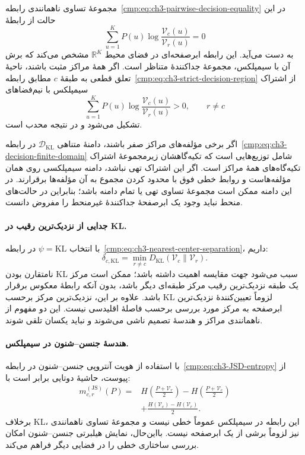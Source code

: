 مجموعهٔ تساوی ناهمانندی
رابطه~\eqref{cmp:eq:ch3-pairwise-decision-equality}
در این حالت از رابطهٔ
\begin{equation}\label{cmp:eq:ch3-kl-decision-hyperplane}
\sum_{u=1}^{K}P(u)
\log\frac{\mathcal V_c(u)}{\mathcal V_r(u)}=0
\end{equation}
به دست می‌آید. این رابطه ابرصفحه‌ای در فضای
محیط $\mathbb R^K$ مشخص می‌کند که برش آن
با سیمپلکس، مجموعهٔ جداکنندهٔ متناظر است.
اگر همهٔ مراکز مثبت باشند، ناحیهٔ تعلق قطعی
به طبقهٔ $c$ مطابق
رابطه~\eqref{cmp:eq:ch3-strict-decision-region}
از اشتراک سیمپلکس با نیم‌فضاهای
\[
\sum_{u=1}^{K}P(u)
\log\frac{\mathcal V_c(u)}{\mathcal V_r(u)}>0,
\qquad r\ne c
\]
تشکیل می‌شود و در نتیجه محدب است.

اگر برخی مؤلفه‌های مراکز صفر باشند،
دامنهٔ متناهی $\mathcal D_{\mathrm{KL}}$ در
رابطه~\eqref{cmp:eq:ch3-decision-finite-domain}
شامل توزیع‌هایی است که تکیه‌گاهشان زیرمجموعهٔ
اشتراک تکیه‌گاه‌های همهٔ مراکز است. اگر این
اشتراک تهی نباشد، دامنه سیمپلکسی روی همان
مؤلفه‌هاست و روابط خطی فوق با محدود کردن مجموع
به آن مؤلفه‌ها برقرارند. در این دامنه ممکن است
مجموعهٔ تساوی تهی یا تمام دامنه باشد؛ بنابراین
در حالت‌های منحط نباید وجود یک ابرصفحهٔ
جداکنندهٔ غیرمنحط را مفروض دانست.

\paragraph{جدایی از نزدیک‌ترین رقیب در KL.}
با انتخاب $\psi=\mathrm{KL}$ در
رابطه~\eqref{cmp:eq:ch3-nearest-center-separation}،
داریم:
\[
\delta_{c,\mathrm{KL}}=
\min_{r\ne c}D_{\mathrm{KL}}(\mathcal V_c\|\mathcal V_r).
\]
نامتقارن بودن KL سبب می‌شود جهت مقایسه اهمیت
داشته باشد؛ ممکن است مرکز یک طبقه نزدیک‌ترین
رقیب مرکز طبقه‌ای دیگر باشد، بدون آنکه رابطهٔ
معکوس برقرار باشد. علاوه بر این، نزدیک‌ترین
مرکز برحسب KL لزوماً تعیین‌کنندهٔ نزدیک‌ترین
ابرصفحه به مرکز مورد بررسی برحسب فاصلهٔ
اقلیدسی نیست. این دو مفهوم از ناهمانندی مراکز
و هندسهٔ تصمیم ناشی می‌شوند و نباید یکسان
تلقی شوند.

\paragraph{هندسهٔ جنسن--شنون در سیمپلکس.}
با استفاده از هویت آنتروپی جنسن--شنون در
رابطه~\eqref{cmp:eq:ch3-JSD-entropy} از پیوست،
حاشیهٔ دوتایی برابر است با:
\begin{equation}\label{cmp:eq:ch3-js-entropy-margin}
\begin{aligned}
m_{c,r}^{(\mathrm{JS})}(P)
={}&H\left(\frac{P+\mathcal V_r}{2}\right)
-H\left(\frac{P+\mathcal V_c}{2}\right)\\
&+\frac{H(\mathcal V_c)-H(\mathcal V_r)}{2}.
\end{aligned}
\end{equation}
برخلاف KL، این رابطه در سیمپلکس عموماً خطی
نیست و مجموعهٔ تساوی ناهمانندی نیز لزوماً
برشی از یک ابرصفحه نیست. بااین‌حال، نمایش
هیلبرتی جنسن--شنون امکان بررسی ساختاری خطی
را در فضایی دیگر فراهم می‌کند.

